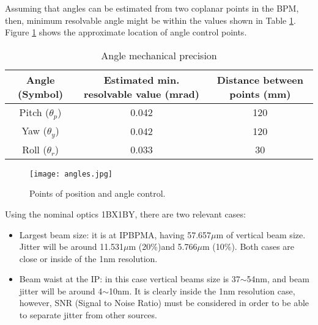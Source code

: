 Assuming that angles can be estimated from two coplanar points in the BPM, then, minimum resolvable angle might be within the values shown in Table \ref{angleprec}. Figure \ref{PAcontrol} shows the approximate location of angle control points.\par
\begin{table}[htb]
 \begin{center}
  \begin{tabular}{|c|c|c|}\hline
  Angle (Symbol) & Estimated min. resolvable value (mrad) & Distance between points (mm)\\\hline
   Pitch ($\theta_p$)&0.042&120\\
   Yaw ($\theta_y$)&0.042&120\\
   Roll ($\theta_r$)&0.033&30\\\hline
  \end{tabular}\caption{Angle mechanical precision}\label{angleprec}
 \end{center}
\end{table}
\begin{figure}[htb]
 \begin{center}
  \texttt{[image: angles.jpg]}\caption{Points of position and angle control.}\label{PAcontrol}
 \end{center}
\end{figure}
Using the nominal optics 1BX1BY, there are two relevant cases:
\begin{itemize}
 \item Largest beam size: it is at IPBPMA, having 57.657$\mu$m of vertical beam size. Jitter will be around 11.531$\mu$m (20\%)and 5.766$\mu$m (10\%). Both cases are close or inside of the 1nm resolution.
 \item Beam waist at the IP: in this case vertical beams size is 37$\sim$54nm, and beam jitter will be around 4$\sim$10nm. It is clearly inside the 1nm resolution case, however, SNR (Signal to Noise Ratio) must be considered in order to be able to separate jitter from other sources.
\end{itemize}
